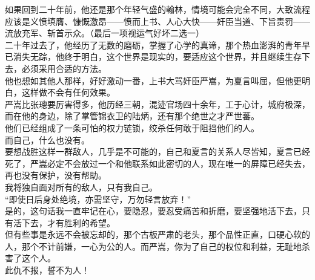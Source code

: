 \begin{multicols}{\theparacolNo}
如果回到二十年前，他还是那个年轻气盛的翰林，情境可能会完全不同，大致流程应该是义愤填膺、慷慨激昂——愤而上书、人心大快——奸臣当道、下旨责罚——流放充军、斩首示众。（最后一项视运气好坏二选一）\\

二十年过去了，他经历了无数的磨砺，掌握了心学的真谛，那个热血澎湃的青年早已消失无踪，他终于明白，这个世界是现实的，要适应这个世界，并且继续生存下去，必须采用合适的方法。\\

他也想如其他人那样，好好激动一番，上书大骂奸臣严嵩，为夏言叫屈，但他更明白，这样做不会有任何效果。\\

严嵩比张璁要厉害得多，他历经三朝，混迹官场四十余年，工于心计，城府极深，而在他的身边，除了掌管锦衣卫的陆炳，还有那个绝世之才严世蕃。\\

他们已经组成了一条可怕的权力链锁，绞杀任何敢于阻挡他们的人。\\

而自己，什么也没有。\\

要想战胜这样一群敌人，几乎是不可能的，自己和夏言的关系人尽皆知，夏言已经死了，严嵩必定不会放过一个和他联系如此密切的人，现在唯一的屏障已经失去，再也没有保护，没有帮助。\\

我将独自面对所有的敌人，只有我自己。\\

“即使日后身处绝境，亦需坚守，万勿轻言放弃！”\\

是的，这句话我一直牢记在心，要隐忍，要忍受痛苦和折磨，要坚强地活下去，只有活下去，才有胜利的希望。\\

但有些事是永远不会被忘却的，那个古板严肃的老头，那个品性正直，口硬心软的人，那个不计前嫌，一心为公的人。而严嵩，你为了自己的权位和利益，无耻地杀害了这个人。\\

此仇不报，誓不为人！\\
\ifnum{}
	\end{multicols}
\fi
\newpage
